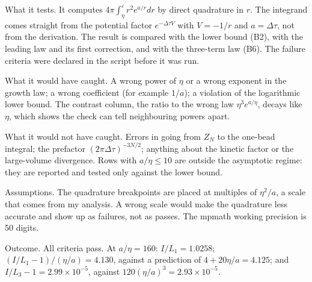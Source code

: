 \documentclass[11pt,a4paper]{article}
\begin{document}
What it tests. It computes \(4\pi\int_\eta^\varepsilon r^2e^{a/r}dr\) by direct quadrature in \(r\). The integrand comes straight from the potential factor \(e^{-\Delta\tau V}\) with \(V=-1/r\) and \(a=\Delta\tau\), not from the derivation. The result is compared with the lower bound (B2), with the leading law and its first correction, and with the three-term law (B6). The failure criteria were declared in the script before it was run.

What it would have caught. A wrong power of \(\eta\) or a wrong exponent in the growth law; a wrong coefficient (for example \(1/a\)); a violation of the logarithmic lower bound. The contrast column, the ratio to the wrong law \(\eta^3e^{a/\eta}\), decays like \(\eta\), which shows the check can tell neighbouring powers apart.

What it would not have caught. Errors in going from \(Z_N\) to the one-bead integral; the prefactor \((2\pi\Delta\tau)^{-3N/2}\); anything about the kinetic factor or the large-volume divergence. Rows with \(a/\eta\le10\) are outside the asymptotic regime: they are reported and tested only against the lower bound.

Assumptions. The quadrature breakpoints are placed at multiples of \(\eta^2/a\), a scale that comes from my analysis. A wrong scale would make the quadrature less accurate and show up as failures, not as passes. The mpmath working precision is 50 digits.

Outcome. All criteria pass. At \(a/\eta=160\): \(I/L_1=1.0258\); \((I/L_1-1)/(\eta/a)=4.130\), against a prediction of \(4+20\eta/a=4.125\); and \(I/L_3-1=2.99\times10^{-5}\), against \(120(\eta/a)^3=2.93\times10^{-5}\).
\end{document}
